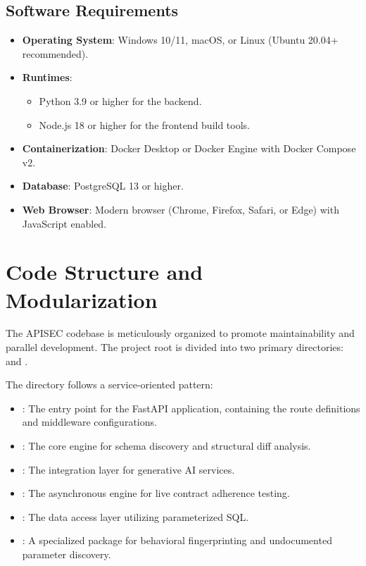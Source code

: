 \documentclass{fisatprojectfinal}
\begin{document}
\subsection{Software Requirements}
\begin{itemize}
    \item \textbf{Operating System}: Windows 10/11, macOS, or Linux (Ubuntu 20.04+ recommended).
    \item \textbf{Runtimes}: 
    \begin{itemize}
        \item Python 3.9 or higher for the backend.
        \item Node.js 18 or higher for the frontend build tools.
    \end{itemize}
    \item \textbf{Containerization}: Docker Desktop or Docker Engine with Docker Compose v2.
    \item \textbf{Database}: PostgreSQL 13 or higher.
    \item \textbf{Web Browser}: Modern browser (Chrome, Firefox, Safari, or Edge) with JavaScript enabled.
\end{itemize}

\section{Code Structure and Modularization}
The APISEC codebase is meticulously organized to promote maintainability and parallel development. The project root is divided into two primary directories:  and .

The  directory follows a service-oriented pattern:
\begin{itemize}
    \item {}: The entry point for the FastAPI application, containing the route definitions and middleware configurations.
    \item {}: The core engine for schema discovery and structural diff analysis.
    \item {}: The integration layer for generative AI services.
    \item {}: The asynchronous engine for live contract adherence testing.
    \item {}: The data access layer utilizing parameterized SQL.
    \item {}: A specialized package for behavioral fingerprinting and undocumented parameter discovery.
\end{itemize}
\end{document}
